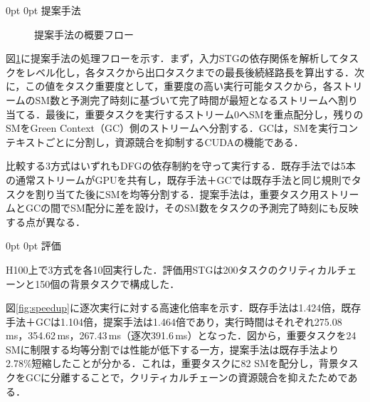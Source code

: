 \documentclass[a4paper,11pt,lualatex,ja=standard]{bxjsarticle}
\makeatletter
\renewcommand{\section}{\@startsection{section}{1}{\z@}%
   {0pt}%
   {0pt}%
   {\reset@font\large\bfseries}}   %
\makeatother
\begin{document}
\section{提案手法}

\begin{figure}[H]
\centering
{}
\caption{提案手法の概要フロー}
\label{fig:proposal-flow}
\end{figure}

図\ref{fig:proposal-flow}に提案手法の処理フローを示す．まず，入力STGの依存関係を解析してタスクをレベル化し，各タスクから出口タスクまでの最長後続経路長を算出する．次に，この値をタスク重要度として，重要度の高い実行可能タスクから，各ストリームのSM数と予測完了時刻に基づいて完了時間が最短となるストリームへ割り当てる．最後に，重要タスクを実行するストリーム0へSMを重点配分し，残りのSMをGreen Context（GC）側のストリームへ分割する．GCは，SMを実行コンテキストごとに分割し，資源競合を抑制するCUDAの機能である\cite{cuda-guide}．

比較する3方式はいずれもDFGの依存制約を守って実行する．既存手法では5本の通常ストリームがGPUを共有し，既存手法＋GCでは既存手法と同じ規則でタスクを割り当てた後にSMを均等分割する．提案手法は，重要タスク用ストリームとGCの間でSM配分に差を設け，そのSM数をタスクの予測完了時刻にも反映する点が異なる．

\section{評価}

H100上で3方式を各10回実行した．評価用STGは200タスクのクリティカルチェーンと150個の背景タスクで構成した．

図\ref{fig:speedup}に逐次実行に対する高速化倍率を示す．既存手法は1.424倍，既存手法＋GCは1.104倍，提案手法は1.464倍であり，実行時間はそれぞれ275.08\,ms，354.62\,ms，267.43\,ms（逐次391.6\,ms）となった．図から，重要タスクを24 SMに制限する均等分割では性能が低下する一方，提案手法は既存手法より2.78\%短縮したことが分かる．これは，重要タスクに82 SMを配分し，背景タスクをGCに分離することで，クリティカルチェーンの資源競合を抑えたためである．
\end{document}
